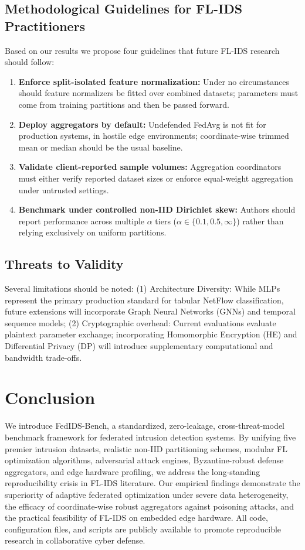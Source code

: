 \documentclass[conference]{IEEEtran}
\begin{document}
\subsection{Methodological Guidelines for FL-IDS Practitioners}
Based on our results we propose four guidelines that future FL-IDS research should follow:
\begin{enumerate}
    \item \textbf{Enforce split-isolated feature normalization:} Under no circumstances should feature normalizers be fitted over combined datasets; parameters must come from training partitions and then be passed forward.
    \item \textbf{Deploy aggregators by default:} Undefended FedAvg is not fit for production systems, in hostile edge environments; coordinate-wise trimmed mean or median should be the usual baseline.
    \item \textbf{Validate client-reported sample volumes:} Aggregation coordinators must either verify reported dataset sizes or enforce equal-weight aggregation under untrusted settings.
    \item \textbf{Benchmark under controlled non-IID Dirichlet skew:} Authors should report performance across multiple $\alpha$ tiers ($\alpha \in \{0.1, 0.5, \infty\}$) rather than relying exclusively on uniform partitions.
\end{enumerate}

\subsection{Threats to Validity}
Several limitations should be noted: (1) Architecture Diversity: While MLPs represent the primary production standard for tabular NetFlow classification, future extensions will incorporate Graph Neural Networks (GNNs) and temporal sequence models; (2) Cryptographic overhead: Current evaluations evaluate plaintext parameter exchange; incorporating Homomorphic Encryption (HE) and Differential Privacy (DP) will introduce supplementary computational and bandwidth trade-offs.

\section{Conclusion}
\label{sec:conclusion}
We introduce FedIDS-Bench, a standardized, zero-leakage, cross-threat-model benchmark framework for federated intrusion detection systems. By unifying five premier intrusion datasets, realistic non-IID partitioning schemes, modular FL optimization algorithms, adversarial attack engines, Byzantine-robust defense aggregators, and edge hardware profiling, we address the long-standing reproducibility crisis in FL-IDS literature. Our empirical findings demonstrate the superiority of adaptive federated optimization under severe data heterogeneity, the efficacy of coordinate-wise robust aggregators against poisoning attacks, and the practical feasibility of FL-IDS on embedded edge hardware. All code, configuration files, and scripts are publicly available to promote reproducible research in collaborative cyber defense.



\end{document}
